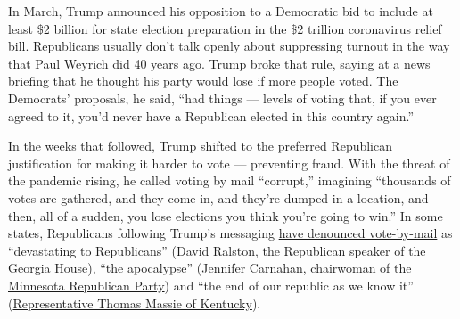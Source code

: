 In March, Trump announced his opposition to a Democratic bid to include
at least \$2 billion for state election preparation in the \$2 trillion
coronavirus relief bill. Republicans usually don't talk openly about
suppressing turnout in the way that Paul Weyrich did 40 years ago. Trump
broke that rule, saying at a news briefing that he thought his party
would lose if more people voted. The Democrats' proposals, he said,
``had things --- levels of voting that, if you ever agreed to it, you'd
never have a Republican elected in this country again.''

In the weeks that followed, Trump shifted to the preferred Republican
justification for making it harder to vote --- preventing fraud. With
the threat of the pandemic rising, he called voting by mail ``corrupt,''
imagining ``thousands of votes are gathered, and they come in, and
they're dumped in a location, and then, all of a sudden, you lose
elections you think you're going to win.'' In some states, Republicans
following Trump's messaging
\href{https://www.nytimes3xbfgragh.onion/2020/04/10/us/politics/vote-by-mail.html}{have
denounced vote-by-mail} as ``devastating to Republicans'' (David
Ralston, the Republican speaker of the Georgia House), ``the
apocalypse''
(\href{https://www.theatlantic.com/politics/archive/2020/04/voting-mail-2020-race-between-biden-and-trump/609799/}{Jennifer
Carnahan, chairwoman of the Minnesota Republican Party}) and ``the end
of our republic as we know it''
(\href{https://twitter.com/RepThomasMassie/status/1242573156776378371}{Representative
Thomas Massie of Kentucky}).

